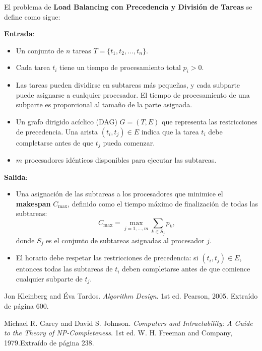 \documentclass{report}
\begin{document}
	El problema de \textbf{Load Balancing con Precedencia y División de Tareas} se define como sigue:
	
	\textbf{Entrada}:
	\begin{itemize}
		\item Un conjunto de $ n $ tareas $ T = \{t_1, t_2, \dots, t_n\} $.
		\item Cada tarea $ t_i $ tiene un tiempo de procesamiento total $ p_i > 0 $.
		\item Las tareas pueden dividirse en subtareas más pequeñas, y cada subparte puede asignarse a cualquier procesador. El tiempo de procesamiento de una subparte es proporcional al tamaño de la parte asignada.
		\item Un grafo dirigido acíclico (DAG) $ G = (T, E) $ que representa las restricciones de precedencia. Una arista $ (t_i, t_j) \in E $ indica que la tarea $ t_i $ debe completarse antes de que $ t_j $ pueda comenzar.
		\item $ m $ procesadores idénticos disponibles para ejecutar las subtareas.
	\end{itemize}
	
	\textbf{Salida}:
	\begin{itemize}
		\item Una asignación de las subtareas a los procesadores que minimice el \textbf{makespan} $ C_{\text{max}} $, definido como el tiempo máximo de finalización de todas las subtareas:
		\[
		C_{\text{max}} = \max_{j=1, \dots, m} \sum_{k \in S_j} p_k,
		\]
		donde $ S_j $ es el conjunto de subtareas asignadas al procesador $ j $.
		\item El horario debe respetar las restricciones de precedencia: si $ (t_i, t_j) \in E $, entonces todas las subtareas de $ t_i $ deben completarse antes de que comience cualquier subparte de $ t_j $.
	\end{itemize}
	
	
	
	\begin{thebibliography}{9}
		Jon Kleinberg and Éva Tardos.
		\textit{Algorithm Design}.
		1st ed. Pearson, 2005. Extraído de página 600.

		Michael R. Garey and David S. Johnson.
		\textit{Computers and Intractability: A Guide to the Theory of NP-Completeness}.
		1st ed. W. H. Freeman and Company, 1979.Extraído de página 238.
	\end{thebibliography}
\end{document}
